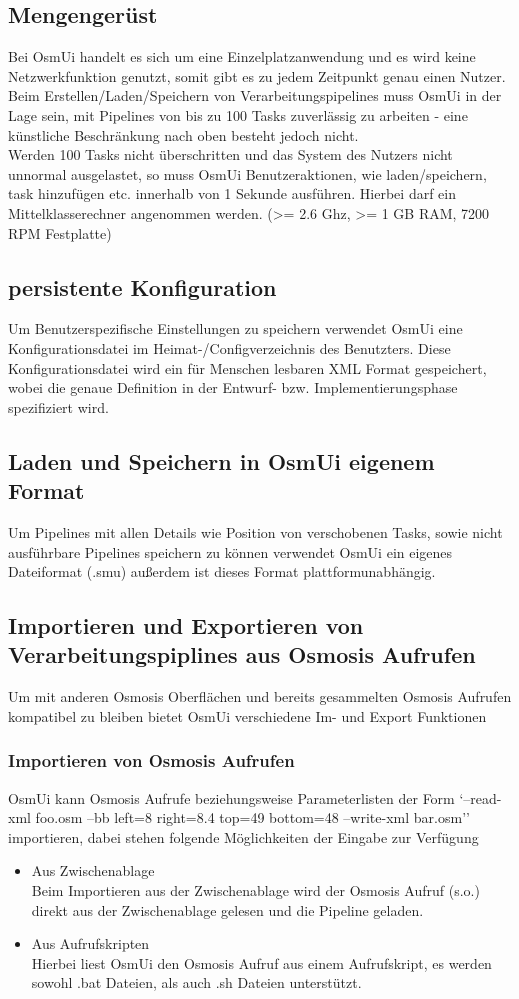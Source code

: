 \documentclass[a4paper,12pt]{scrartcl}
\begin{document}
\subsection{Mengengerüst}
Bei OsmUi handelt es sich um eine Einzelplatzanwendung und es wird keine Netzwerkfunktion genutzt, somit gibt es zu jedem Zeitpunkt genau einen Nutzer.\\
Beim Erstellen/Laden/Speichern von Verarbeitungspipelines muss OsmUi in der Lage sein, mit Pipelines von bis zu 100 Tasks zuverlässig zu arbeiten -
eine künstliche Beschränkung nach oben besteht jedoch nicht.\\
Werden 100 Tasks nicht überschritten und das System des Nutzers nicht unnormal ausgelastet, so muss OsmUi Benutzeraktionen, wie laden/speichern, task hinzufügen etc.
innerhalb von 1 Sekunde ausführen. Hierbei darf ein Mittelklasserechner angenommen werden. (>= 2.6 Ghz, >= 1 GB RAM, 7200 RPM Festplatte)
\subsection{persistente Konfiguration}
Um Benutzerspezifische Einstellungen zu speichern verwendet OsmUi eine Konfigurationsdatei im Heimat-/Configverzeichnis des Benutzters.
Diese Konfigurationsdatei wird ein für Menschen lesbaren XML Format gespeichert, wobei die genaue Definition in der Entwurf- bzw. Implementierungsphase
spezifiziert wird. 
\subsection{Laden und Speichern in OsmUi eigenem Format}
Um Pipelines mit allen Details wie Position von verschobenen Tasks, sowie nicht ausführbare Pipelines speichern zu können verwendet OsmUi ein eigenes Dateiformat
(.smu) außerdem ist dieses Format plattformunabhängig.
\subsection{Importieren und Exportieren von Verarbeitungspiplines aus Osmosis Aufrufen}
Um mit anderen Osmosis Oberflächen und bereits gesammelten Osmosis Aufrufen kompatibel zu bleiben bietet OsmUi verschiedene Im- und Export Funktionen
\subsubsection{Importieren von Osmosis Aufrufen}
OsmUi kann Osmosis Aufrufe beziehungsweise Parameterlisten der Form `--read-xml foo.osm --bb left=8 right=8.4 top=49 bottom=48 --write-xml bar.osm'' 
importieren, dabei stehen folgende Möglichkeiten der Eingabe zur Verfügung
\begin{itemize}
  \item Aus Zwischenablage\\
  Beim Importieren aus der Zwischenablage wird der Osmosis Aufruf (s.o.) direkt aus der Zwischenablage gelesen und die Pipeline geladen.
  \item Aus Aufrufskripten\\
  Hierbei liest OsmUi den Osmosis Aufruf aus einem Aufrufskript, es werden sowohl .bat Dateien, als auch .sh Dateien unterstützt.
\end{itemize}
\end{document}
